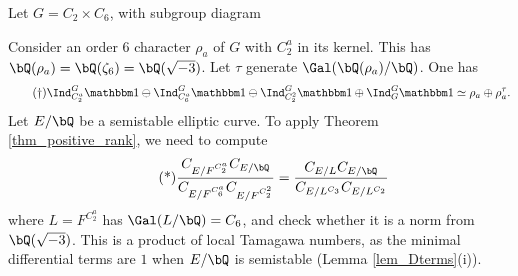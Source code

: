 \begin{example}
    Let $G = C_2 \times C_6$, with subgroup diagram
    \begin{figure}[H]
        \centering
    \end{figure}
    
    Consider an order $6$ character $\rho_a$ of $G$ with $C_2^{a}$ in its kernel. This has $\bQ(\rho_a) = \bQ(\zeta_6) = \bQ(\sqrt{-3})$. Let $\tau$ generate $\Gal(\bQ(\rho_a) / \bQ)$. One has
    \begin{equation}\label{ex1-rel}\tag{\textdagger}
    \Ind_{C_2^{a}}^G \trivial  \ominus \Ind_{C_6^{a}}^G \trivial \ominus \Ind_{C_2^{2}}^G \trivial \oplus \Ind_G^G \trivial \simeq \rho_a \oplus \rho_a^{\tau} .
    \end{equation}
    Let $E / \bQ$ be a semistable elliptic curve. To apply Theorem \ref{thm_positive_rank}, we need to compute
    \begin{equation}\label{ex1}\tag{*} 
        \frac{C_{E / F^{C_2^a}} C_{E / \bQ} }{C_{E / F^{C_6^a}} C_{E / F^{C_2^2}}} = 
        \frac{C_{E / L} C_{E / \bQ}}{C_{E / L^{C_3}} C_{E / L^{C_2}}}
    \end{equation} 
    where $L = F^{C_2^a}$ has $\Gal(L / \bQ) = C_6$, and check whether it is a norm from $\bQ(\sqrt{-3})$. This is a product of local Tamagawa numbers, as the minimal differential terms are $1$ when $E / \bQ$ is semistable (Lemma \ref{lem_Dterms}(i)). 
    

\end{example}
